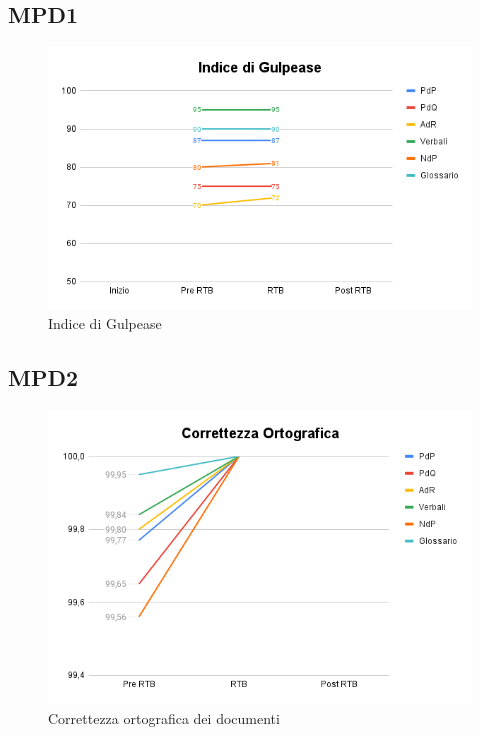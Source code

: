 \subsection{MPD1}
\begin{figure}[h!]
    \centering
    \includegraphics[scale=0.62]{../../assets/Indice di Gulpease.png}
    \caption{Indice di Gulpease}
\end{figure}
\newpage
\subsection{MPD2}
\begin{figure}[h!]
    \centering
    \includegraphics[scale=0.65]{../../assets/correttezza_ortografica.png}
    \caption{Correttezza ortografica dei documenti}
\end{figure}